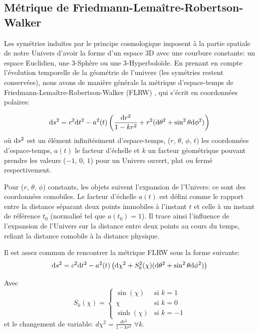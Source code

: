 \documentclass[../main/main.tex]{subfiles}
\begin{document}
\subsection{Métrique de Friedmann-Lemaître-Robertson-Walker}\label{ssec:FLRW}

Les symétries induites par le principe cosmologique imposent à la partie
spatiale de notre Univers d'avoir la forme d'un espace 3D avec une
courbure constante: un espace Euclidien, une 3-Sphère ou une
3-Hyperboloïde. En prenant en compte l'évolution temporelle de la
géométrie de l'univers (les symétries restent conservées), nous avons de
manière générale la métrique d'espace-temps de Friedmann-Lemaître-Robertson-Walker (FLRW)
\citep{Friedmann1922,Lemaitre1933,Robertson1936,Walker1937}, qui s'écrit
en coordonnées polaires:

\begin{equation}
  \label{eq:FLRW}
  \mathrm{d} s^{2}=c^{2}\mathrm{d} t^{2}-a^{2}(t)\left( \frac{\mathrm{d} r^{2}}{1-kr^{2}}+r^{2}(\mathrm{d}\theta^{2}+\sin^{2}\theta\mathrm{d}\phi^{2})\right)
\end{equation}
où $\mathrm{d} s^{2}$ est un élément infinitésiment d'espace-temps, ($r$,
$\theta$, $\phi$, $t$) les coordonnées d'espace-temps, $a(t)$ le
facteur d'échelle et $k$ un facteur géométrique pouvant prendre les
valeurs ($-1$, $0$, $1$) pour un Univers ouvert, plat ou fermé
respectivement.

Pour ($r$, $\theta$, $\phi$) constants, les objets
suivent l'expansion de l'Univers: ce sont des coordonnées comobiles.
Le facteur d'échelle $a(t)$ est défini comme le rapport entre la
distance séparant deux points immobiles à l'instant $t$ et celle à un
instant de référence $t_{0}$ (normalisé tel que $a(t_{0})=1$). Il trace
ainsi l'influence de l'expansion de l'Univers sur la distance entre deux
points au cours du temps, reliant la distance comobile à la distance
physique.

Il est assez commun de rencontrer la métrique FLRW sous la forme
suivante:
\begin{equation}
  \label{eq:FLRW2}
  \mathrm{d} s^{2}=c^{2}\mathrm{d} t^{2}-a^{2}(t) \left( \mathrm{d}\chi^{2}+S^{2}_{k}(\chi)(\mathrm{d}\theta^{2}+\sin^{2}\theta \mathrm{d}\phi^{2}) \right)
\end{equation}

Avec 
\begin{equation}
  S_{k}(\chi) =
  \begin{cases}
        \sin(\chi) & \text{si }  k=1 \\
        \chi & \text{si }  k=0 \\
        \sinh(\chi) & \text{si }  k=-1
    \end{cases}
\end{equation}
et le changement de variable:  $d\chi^{2}=\frac{dr^{2}}{1-kr^{2}}$ $\forall k$.
\end{document}
